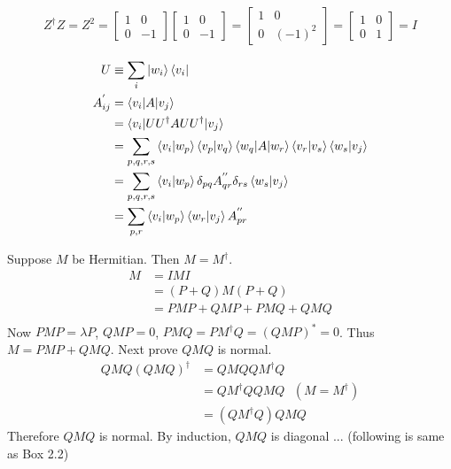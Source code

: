 \begin{align*}
	Z^\dagger Z = Z^2 = \begin{bmatrix}
		1 & 0 \\
		0 & -1
	\end{bmatrix}
	\begin{bmatrix}
		1 & 0 \\
		0 & -1
	\end{bmatrix}
	= \begin{bmatrix}
		1 & 0 \\
		0 & (-1)^2
	\end{bmatrix}
	= \begin{bmatrix}
		1 & 0 \\
		0 & 1
	\end{bmatrix} = I
\end{align*}

\begin{align*}
	U &\equiv \sum_i \ket{w_i}\bra{v_i}\\
	A_{ij}^{'} &= \braket{v_i | A | v_j}\\
	&= \braket{v_i | UU^\dagger A UU^\dagger | v_j}\\
	&= \sum_{p,q,r,s} \braket{v_i | w_p} \braket{v_p | v_q} \braket{w_q | A | w_r} \braket{v_r | v_s} \braket{w_s | v_j}\\
	&= \sum_{p,q,r,s} \braket{v_i | w_p} \delta_{pq} A_{qr}^{''} \delta_{rs}  \braket{w_s | v_j}\\
	&= \sum_{p,r}  \braket{v_i | w_p}  \braket{w_r | v_j} A_{pr}^{''}
\end{align*}



Suppose $M$ be Hermitian. Then $M = M^\dagger$.
\begin{align*}
	M &= IMI\\
		&= (P+Q) M (P+Q)\\
		&= PMP + QMP + PMQ + QMQ\\
\end{align*}
Now $PMP = \lambda P$, $QMP = 0$, $PMQ = PM^\dagger Q = (QMP)^* = 0$.
Thus $M = PMP + QMQ$.
Next prove $QMQ$ is normal.
\begin{align*}
	QMQ (QMQ)^\dagger &= QMQ QM^\dagger Q\\
		&= QM^\dagger Q QMQ ~~~ (M = M^\dagger)\\
		&= (QM^\dagger Q) QMQ
\end{align*}
Therefore $QMQ$ is normal.
By induction, $QMQ$ is diagonal ... (following is same as Box 2.2)


